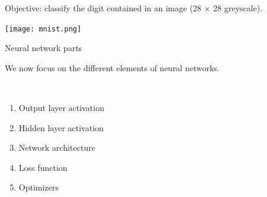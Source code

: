 \documentclass[
  10pt,
  ignorenonframetext,
]{beamer}
\providecommand{\tightlist}{%
  \setlength{\itemsep}{0pt}\setlength{\parskip}{0pt}}
\begin{document}
\begin{frame}
Objective: classify the digit contained in an image (28 \(\times\) 28
greyscale).

\texttt{[image: mnist.png]}
\end{frame}

\begin{frame}
\begin{block}{Neural network parts}
\protect\hypertarget{neural-network-parts}{}
\(~\)

We now focus on the different elements of neural networks.

\(~\)

\begin{enumerate}
[1)]
\tightlist
\item
  Output layer activation
\end{enumerate}

\vspace{2mm}

\begin{enumerate}
[1)]
\setcounter{enumi}{1}
\tightlist
\item
  Hidden layer activation
\end{enumerate}

\vspace{2mm}

\begin{enumerate}
[1)]
\setcounter{enumi}{2}
\tightlist
\item
  Network architecture
\end{enumerate}

\vspace{2mm}

\begin{enumerate}
[1)]
\setcounter{enumi}{3}
\tightlist
\item
  Loss function
\end{enumerate}

\vspace{2mm}

\begin{enumerate}
[1)]
\setcounter{enumi}{4}
\tightlist
\item
  Optimizers
\end{enumerate}
\end{block}
\end{frame}
\end{document}
